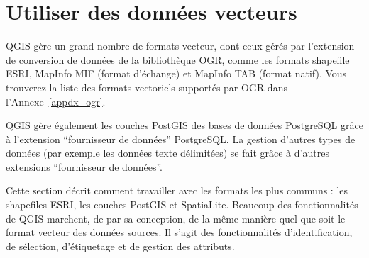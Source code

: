 
\section{Utiliser des données vecteurs}\label{label_workingvector}



QGIS gère un grand nombre de formats vecteur, dont ceux gérés par l'extension de conversion de données de la bibliothèque OGR, comme les formats shapefile ESRI, MapInfo MIF (format d'échange) et  MapInfo TAB (format natif).
Vous trouverez la liste des formats vectoriels supportés par OGR dans l'Annexe~\ref{appdx_ogr}.

QGIS gère également les couches PostGIS des bases de données PostgreSQL grâce à l'extension ``fournisseur de données'' PostgreSQL. La gestion d'autres types de données (par exemple les données texte délimitées) se fait grâce à d'autres extensions ``fournisseur de données''.

Cette section décrit comment travailler avec les formats les plus communs : les shapefiles ESRI, les couches PostGIS et SpatiaLite. Beaucoup des fonctionnalités de QGIS marchent, de par sa conception, de la même manière quel que soit le format vecteur des données sources. Il s'agit des fonctionnalités d'identification, de sélection, d'étiquetage et de gestion des attributs.

